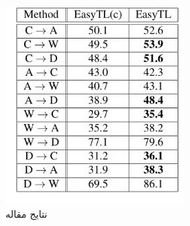 \begin{figure}[H]
	\centering
	\begin{subfigure}[b]{0.2\textwidth}
		\centering
		\includegraphics[width=\linewidth]{images/3_4.jpg}
		\caption{نتایج مقاله}
	\end{subfigure}%
	\begin{subfigure}[b]{0.2\textwidth}
		\centering

\end{subfigure}
\end{figure}
